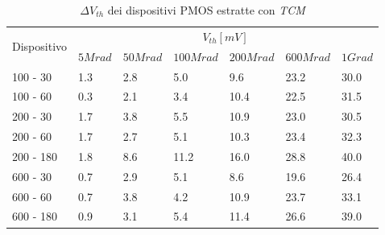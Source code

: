 \documentclass[12pt, letterpaper]{book}
\begin{document}
\begin{table}[H]
  \renewcommand{\arraystretch}{1.3}
  \begin{tabular}{m{2cm}  m{1.1cm} m{1.3cm} m{1.5cm} m{1.5cm} m{1.5cm} m{1cm}}
    \toprule
    \multirow{2}{*}{Dispositivo} & \multicolumn{6}{c}{$V_{th} [mV] $}                                                          \\
    \cmidrule{2-7}
                                 & $5Mrad$                            & $50Mrad$ & $100Mrad$ & $200Mrad$ & $600Mrad$ & $1Grad$ \\
    \midrule
    100 - 30                     & 1.3                                & 2.8      & 5.0       & 9.6       & 23.2      & 30.0    \\
    \hline
    100 - 60                     & 0.3                                & 2.1      & 3.4       & 10.4      & 22.5      & 31.5    \\
    \hline
    200 - 30                     & 1.7                                & 3.8      & 5.5       & 10.9      & 23.0      & 30.5    \\
    \hline
    200 - 60                     & 1.7                                & 2.7      & 5.1       & 10.3      & 23.4      & 32.3    \\
    \hline
    200 - 180                    & 1.8                                & 8.6      & 11.2      & 16.0      & 28.8      & 40.0    \\
    \hline
    600 - 30                     & 0.7                                & 2.9      & 5.1       & 8.6       & 19.6      & 26.4    \\
    \hline
    600 - 60                     & 0.7                                & 3.8      & 4.2       & 10.9      & 23.7      & 33.1    \\
    \hline
    600 - 180                    & 0.9                                & 3.1      & 5.4       & 11.4      & 26.6      & 39.0    \\
    \bottomrule
  \end{tabular}
  \caption{$\Delta V_{th}$ dei dispositivi PMOS estratte con \emph{TCM}}
  \label{tab:deltaVthTCMP}
\end{table}
\end{document}
